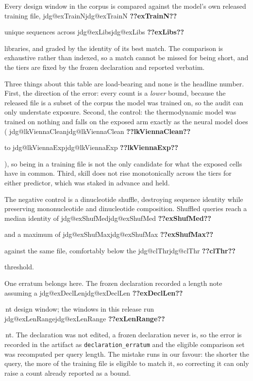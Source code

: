 \documentclass[11pt]{article}
\makeatletter
\newcommand{\jdg}[1]{%
  \ifcsname jdg@#1\endcsname\csname jdg@#1\endcsname
  \else\textbf{??#1??}\PackageError{nm}{undefined measured quantity #1}{}\fi}
\makeatother
\begin{document}
Every design window in the corpus is compared against the model's own released training file, \jdg{exTrainN} unique sequences across \jdg{exLibs} libraries, and graded by the identity of its
best match. The comparison is exhaustive rather than indexed, so a match cannot be missed for being
short, and the tiers are fixed by the frozen declaration and reported verbatim.

\begin{table}[!htbp]
\centering\small
\caption{\textbf{How much of this corpus the model had already read.} Exposure tier of each design
cell against the released training file, and the libraries the exposed cells trace to.}
\label{tab:exposure}

\end{table}

\begin{table}[!htbp]
\centering\small
\caption{\textbf{Skill on each arm of the split.} Within-stratum skill slope on the whole corpus
and on the two halves of the exposure split.}
\label{tab:exposurearms}

\end{table}

Three things about this table are load-bearing and none is the headline number. First, the
direction of the error: every count is a \emph{lower} bound, because the released file is a subset
of the corpus the model was trained on, so the audit can only understate exposure. Second, the
control: the thermodynamic model was trained on nothing and falls on the exposed arm exactly as the
neural model does (\jdg{lkViennaClean} to \jdg{lkViennaExp}), so being in a training file is not
the only candidate for what the exposed cells have in common. Third, skill does not rise
monotonically across the tiers for either predictor, which was staked in advance and held.

The negative control is a dinucleotide shuffle, destroying sequence identity while preserving
mononucleotide and dinucleotide composition. Shuffled queries reach a median identity of
\jdg{exShufMed} and a maximum of \jdg{exShufMax} against the same file, comfortably below the
\jdg{clThr} threshold.

One erratum belongs here. The frozen declaration recorded a length note assuming a
\jdg{exDeclLen}\,nt design window; the windows in this release run \jdg{exLenRange}\,nt. The
declaration was not edited, a frozen declaration never is, so the error is recorded in the
artifact as \texttt{declaration\_erratum} and the eligible comparison set was recomputed per query
length. The mistake runs in our favour: the shorter the query, the more of the training file is
eligible to match it, so correcting it can only raise a count already reported as a bound.
\end{document}

